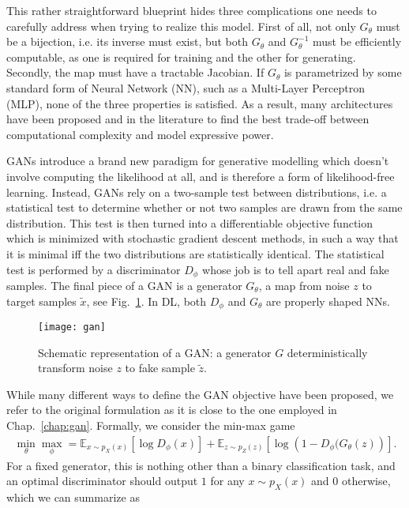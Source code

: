This rather straightforward blueprint hides three complications one needs to carefully address when trying to realize this model. First of all, not only $G_{\theta}$ must be a bijection, i.e. its inverse must exist, but both $G_{\theta}$ and $G_{\theta}^{-1}$ must be efficiently computable, as one is required for training and the other for generating. Secondly, the map must have a tractable Jacobian. If $G_{\theta}$ is parametrized by some standard form of Neural Network (NN), such as a Multi-Layer Perceptron (MLP), none of the three properties is satisfied. As a result, many architectures have been proposed and in the literature to find the best trade-off between computational complexity and model expressive power.

GANs introduce a brand new paradigm for generative modelling which doesn't involve computing the likelihood at all, and is therefore a form of likelihood-free learning. Instead, GANs rely on a two-sample test between distributions, i.e. a statistical test to determine whether or not two samples are drawn from the same distribution. This test is then turned into a differentiable objective function which is minimized with stochastic gradient descent methods, in such a way that it is minimal iff the two distributions are statistically identical.
The statistical test is performed by a discriminator $D_{\phi}$ whose job is to tell apart real and fake samples. The final piece of a GAN is a generator $G_{\theta}$, a map from noise $z$ to target samples $\tilde{x}$, see Fig.~\ref{fig:gan}. In DL, both $D_{\phi}$ and $G_{\theta}$ are properly shaped NNs.
%
\begin{figure}[t]
\centering
\texttt{[image: gan]}
\caption{Schematic representation of a GAN: a generator $G$ deterministically transform noise $z$ to fake sample $\tilde{z}$. }
\label{fig:gan}
\end{figure}
%
While many different ways to define the GAN objective have been proposed, we refer to the original formulation as it is close to the one employed in Chap.~\ref{chap:gan}. Formally, we consider the min-max game 
%
\begin{align}
\min_{\theta} \max_{\phi} = \mathbb{E}_{x \sim p_{X}(x)} \left[ \log D_{\phi} (x) \right] + \mathbb{E}_{z\sim p_{Z}(z)} \left[ \log \left( 1 - D_{\phi} (G_{\theta}(z) \right) \right].
\end{align}
%
For a fixed generator, this is nothing other than a binary classification task, and an optimal discriminator should output $1$ for any $x \sim p_{X}(x)$ and $0$ otherwise, which we can summarize as
